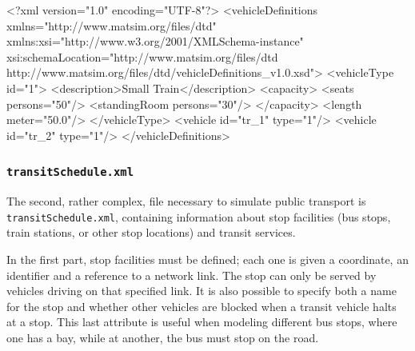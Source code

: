\begin{xml}
<?xml version="1.0" encoding="UTF-8"?> 
<vehicleDefinitions xmlns="http://www.matsim.org/files/dtd" 
       xmlns:xsi="http://www.w3.org/2001/XMLSchema-instance" 
       xsi:schemaLocation="http://www.matsim.org/files/dtd http://www.matsim.org/files/dtd/vehicleDefinitions_v1.0.xsd"> 
	<vehicleType id="1"> 
      <description>Small Train</description> 
      <capacity> 
         <seats persons="50"/> 
         <standingRoom persons="30"/> 
      </capacity> 
      <length meter="50.0"/> 
   </vehicleType> 
   <vehicle id="tr_1" type="1"/> 
   <vehicle id="tr_2" type="1"/> 
</vehicleDefinitions>
\end{xml}

\subsubsection{\lstinline|transitSchedule.xml|}
\label{sec:inputdata:transitschedule}
The second, rather complex, file necessary to simulate public transport is \lstinline|transitSchedule.xml|, containing information about stop facilities (bus stops, train stations, or other stop locations) and transit services.

In the first part, stop facilities must be defined; each one is given a coordinate, an identifier and a reference to a network link. The stop can only be served by vehicles driving on that specified link. It is also possible to specify both a name for the stop and whether other vehicles are blocked when a transit vehicle halts at a stop. This last attribute is useful when modeling \eg different bus stops, where one has a bay, while at another, the bus must stop on the road.

